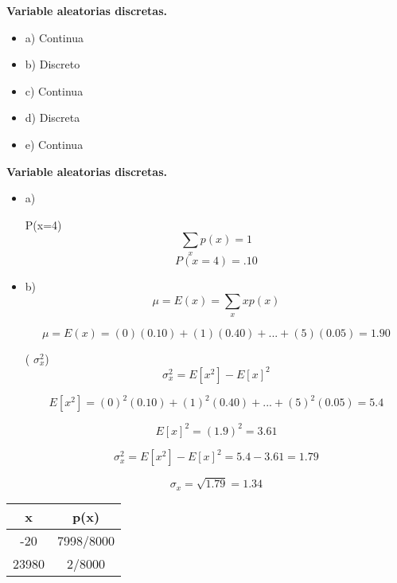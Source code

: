 \documentclass{../oxmathproblems}
\begin{document}
\begin{questions}

\question\textbf {Variable aleatorias discretas.}

\begin{itemize}
\item  a) Continua 
\item  b) Discreto 
\item  c) Continua 
\item  d) Discreta 
\item  e) Continua 
\end{itemize}

\question\textbf {Variable aleatorias discretas.}

\begin{itemize}
\item  a) 

 P(x=4) 
        $$ \sum_x p(x)= 1 $$ 
$$ P(x=4) = .10$$

\item  b) 
$$ \mu = E(x)= \sum_x xp(x)$$


$$ \mu = E(x)= (0)(0.10)+ (1)(0.40)+ ... +(5)(0.05) = 1.90 $$

  ( $\sigma^2_x$) 
  $$ \sigma^2_x = E[x^2]-E[x]^2 $$
  
$$ E[x^2] = (0)^2(0.10)+ (1)^2(0.40)+ ... +(5)^2(0.05)= 5.4 $$ 

$$ E[x]^2 = (1.9)^2 = 3.61  $$

 $$ \sigma^2_x = E[x^2]-E[x]^2 = 5.4 - 3.61 = 1.79 $$


$$ \sigma_x = \sqrt{1.79} = 1.34 $$ 
\end{itemize}

\question 
{}  


 \begin{center}
\begin{tabular}{ |c|c| } 
 \hline
 \textbf{x} & \textbf{p(x)} \\ 
 \hline
 -20 & 7998/8000 \\
 23980  & 2/8000 \\
 \hline
\end{tabular}
\end{center} 


\end{questions}
\end{document}
